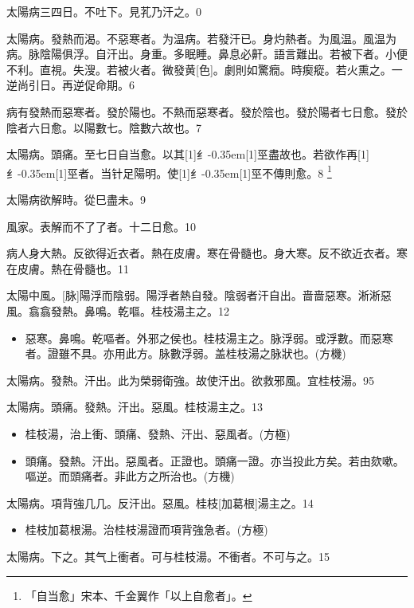 \documentclass[11pt,oneside,b5paper]{ctexbook}
\begin{document}
\begin{flushleft}
太陽病三四日。不吐下。見芤乃汗之。0

太陽病。發熱而渴。不惡寒者。为温病。若發汗已。身灼熱者。为風温。風温为病。脉陰陽俱浮。自汗出。身重。多眠睡。鼻息必鼾。語言難出。若被下者。小便不利。直視。失溲。若被火者。微發黄[色]。劇則如驚癇。時瘈瘲。若火熏之。一逆尚引日。再逆促命期。6

病有發熱而惡寒者。發於陽也。不熱而惡寒者。發於陰也。發於陽者七日愈。發於陰者六日愈。以陽數七。陰數六故也。7

太陽病。頭痛。至七日自当愈。以其{\hbox{\scalebox{0.68}[1]{纟}\kern-0.35em\scalebox{0.64}[1]{巠}}}盡故也。若欲作再{\hbox{\scalebox{0.68}[1]{纟}\kern-0.35em\scalebox{0.64}[1]{巠}}}者。当针足陽明。使{\hbox{\scalebox{0.68}[1]{纟}\kern-0.35em\scalebox{0.64}[1]{巠}}}不傳則愈。8
\footnote{「自当愈」宋本、千金翼作「以上自愈者」。}

太陽病欲解時。從巳盡未。9

風家。表解而不了了者。十二日愈。10

病人身大熱。反欲得近衣者。熱在皮膚。寒在骨髓也。身大寒。反不欲近衣者。寒在皮膚。熱在骨髓也。11

太陽中風。[脉]陽浮而陰弱。陽浮者熱自發。陰弱者汗自出。啬啬惡寒。淅淅惡風。翕翕發熱。鼻鳴。乾嘔。桂枝湯主之。12

\begin{itemize}
\item 惡寒。鼻鳴。乾嘔者。外邪之侯也。桂枝湯主之。脉浮弱。或浮數。而惡寒者。證雖不具。亦用此方。脉數浮弱。盖桂枝湯之脉狀也。(方機)
\end{itemize}

太陽病。發熱。汗出。此为榮弱衛強。故使汗出。欲救邪風。宜桂枝湯。95

太陽病。頭痛。發熱。汗出。惡風。桂枝湯主之。13

\begin{itemize}
\item 桂枝湯，治上衝、頭痛、發熱、汗出、惡風者。(方極)
\item 頭痛。發熱。汗出。惡風者。正證也。頭痛一證。亦当投此方矣。若由欬嗽。嘔逆。而頭痛者。非此方之所治也。(方機)
\end{itemize}

太陽病。項背強几几。反汗出。惡風。桂枝[加葛根]湯主之。14

\begin{itemize}
\item 桂枝加葛根湯。治桂枝湯證而項背強急者。(方極)
\end{itemize}

太陽病。下之。其气上衝者。可与桂枝湯。不衝者。不可与之。15


\end{flushleft}
\end{document}
